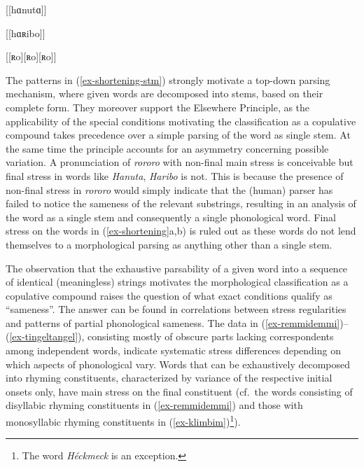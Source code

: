 \documentclass[output=paper
 ,nobabel
 ,draftmode
 ,colorlinks, citecolor=brown
]{langscibook}
\begin{document}
\settowidth{}
\eal\label{ex-shortening-stm}

\ex\label{ex-hanuta-stm}
{[[hɑnutɑ]]}

\ex\label{ex-haribo-stm}
{[[hɑʀibo]]}

\ex\label{ex-rororo-stm}
{[[ʀo][ʀo][ʀo]]}
\zl

\noindent
The patterns in (\ref{ex-shortening-stm}) strongly motivate a top-down parsing mechanism, where given words are decomposed into stems, based on their complete form. They moreover support the Elsewhere Principle, as the applicability of the special conditions motivating the classification as a copulative compound takes precedence over a simple parsing of the word as single stem. At the same time the principle accounts for an asymmetry concerning possible variation. A pronunciation of \emph{rororo} with non-final main stress is conceivable but final stress in words like \emph{Hanuta}, \emph{Haribo} is not. This is because the presence of non-final stress in \emph{rororo} would simply indicate that the (human) parser has failed to notice the sameness of the relevant substrings, resulting in an analysis of the word as a single stem and consequently a single phonological word. Final stress on the words in (\ref{ex-shortening}a,b) is ruled out as these words do not lend themselves to a morphological parsing as anything other than a single stem.

\largerpage[2]
The observation that the exhaustive parsability of a given word into a sequence of identical (meaningless) strings motivates the morphological classification as a copulative compound raises the question of what exact conditions qualify as ``sameness''. The answer can be found in correlations between stress regularities and patterns of partial phonological sameness. The data in (\ref{ex-remmidemmi})–(\ref{ex-tingeltangel}), consisting mostly of  obscure parts lacking correspondents among independent words, indicate
systematic stress differences depending on which aspects of phonological vary. Words that can be
exhaustively decomposed into rhyming constituents, characterized by variance of the respective
initial onsets only, have main stress on the final constituent (cf.\ the words consisting of
disyllabic rhyming constituents in (\ref{ex-remmidemmi}) and those with monosyllabic rhyming
constituents in (\ref{ex-klimbim})\footnote{The word \emph{Héckmeck} is an exception.}).  
\end{document}
